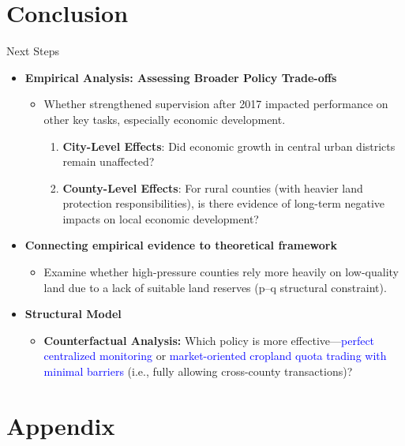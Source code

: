 \documentclass[10pt, xcolor=x11names,compress, aspectratio=169]{beamer}
\begin{document}
\section*{Conclusion}
\begin{frame}{Next Steps}
\begin{itemize}
    \item \textbf{Empirical Analysis: Assessing Broader Policy Trade-offs}
    \begin{itemize}
        \item Whether strengthened supervision after 2017 impacted performance on other key tasks, especially economic development.
        \begin{enumerate}
            \item \textbf{City-Level Effects}: Did economic growth in central urban districts remain unaffected?
            \item \textbf{County-Level Effects}: For rural counties (with heavier land protection responsibilities), is there evidence of long-term negative impacts on local economic development?
        \end{enumerate}
    \end{itemize}
    
    \item \textbf{Connecting empirical evidence to theoretical framework}
    \begin{itemize}
        \item Examine whether high-pressure counties rely more heavily on low-quality land due to a lack of suitable land reserves (p–q structural constraint).
    \end{itemize}

    \item \textbf{Structural Model}
    \begin{itemize}
        \item \textbf{Counterfactual Analysis:} Which policy is more effective—\textcolor{blue}{perfect centralized monitoring} or \textcolor{blue}{market-oriented cropland quota trading with minimal barriers} (i.e., fully allowing cross-county transactions)?
    \end{itemize}
\end{itemize}
\end{frame}

\section*{Appendix}
\end{document}
